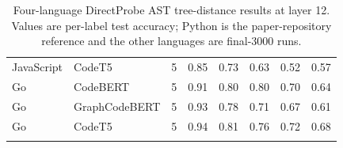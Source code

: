 \begin{table}[p]
{\begin{tabular}{llrrrrrr}
JavaScript & CodeT5 & 5 & 0.85 & 0.73 & 0.63 & 0.52 & 0.57 \\
\addlinespace
Go & CodeBERT & 5 & 0.91 & 0.80 & 0.80 & 0.70 & 0.64 \\
Go & GraphCodeBERT & 5 & 0.93 & 0.78 & 0.71 & 0.67 & 0.61 \\
Go & CodeT5 & 5 & 0.94 & 0.81 & 0.76 & 0.72 & 0.68 \\
\addlinespace
\bottomrule
\end{tabular}%
}
\caption{Four-language DirectProbe AST tree-distance results at layer 12. Values are per-label test accuracy; Python is the paper-repository reference and the other languages are final-3000 runs.}
\label{tab:distance}
\end{table}
